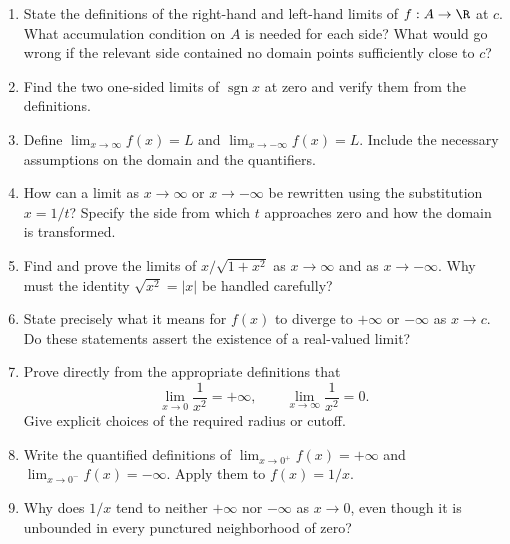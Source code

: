 \begin{enumerate}[resume]
  \item State the definitions of the right-hand and left-hand limits
    of \(f:A\to\R\) at \(c\). What accumulation condition on \(A\)
    is needed for each side? What would go wrong if the relevant side
    contained no domain points sufficiently close to \(c\)?

  \item Find the two one-sided limits of \(\operatorname{sgn}x\) at
    zero and verify them from the definitions.

  \item Define \(\lim_{x\to\infty}f(x)=L\) and
    \(\lim_{x\to-\infty}f(x)=L\). Include the necessary assumptions
    on the domain and the quantifiers.

  \item How can a limit as \(x\to\infty\) or \(x\to-\infty\)
    be rewritten using the substitution \(x=1/t\)? Specify the side
    from which \(t\) approaches zero and how the domain is transformed.

  \item Find and prove the limits of \(x/\sqrt{1+x^2}\) as
    \(x\to\infty\) and as \(x\to-\infty\).
    Why must the identity \(\sqrt{x^2}=|x|\) be handled carefully?

  \item State precisely what it means for \(f(x)\) to diverge to
    \(+\infty\) or \(-\infty\) as \(x\to c\).
    Do these statements assert the existence of a real-valued limit?

  \item Prove directly from the appropriate definitions that
    \[
      \lim_{x\to0}\frac{1}{x^2}=+\infty,
      \qquad
      \lim_{x\to\infty}\frac{1}{x^2}=0.
    \]
    Give explicit choices of the required radius or cutoff.

  \item Write the quantified definitions of
    \(\lim_{x\to0^+}f(x)=+\infty\) and
    \(\lim_{x\to0^-}f(x)=-\infty\).
    Apply them to \(f(x)=1/x\).

  \item Why does \(1/x\) tend to neither \(+\infty\) nor
    \(-\infty\) as \(x\to0\), even though it is unbounded in every
    punctured neighborhood of zero?


\end{enumerate}
